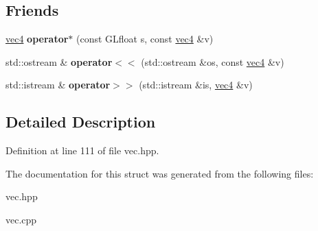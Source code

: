 \subsection*{Friends}
\begin{DoxyCompactItemize}
\item 
\hypertarget{struct_angel_1_1vec4_a18b1a91dc4c502220d099d6d85e504bc}{\hyperlink{struct_angel_1_1vec4}{vec4} {\bfseries operator$\ast$} (const G\-Lfloat s, const \hyperlink{struct_angel_1_1vec4}{vec4} \&v)}\label{struct_angel_1_1vec4_a18b1a91dc4c502220d099d6d85e504bc}

\item 
\hypertarget{struct_angel_1_1vec4_afadcf8884205c469256e4be7d96bfa12}{std\-::ostream \& {\bfseries operator$<$$<$} (std\-::ostream \&os, const \hyperlink{struct_angel_1_1vec4}{vec4} \&v)}\label{struct_angel_1_1vec4_afadcf8884205c469256e4be7d96bfa12}

\item 
\hypertarget{struct_angel_1_1vec4_ada396ae1c4ef513c6baf301f20f89bfa}{std\-::istream \& {\bfseries operator$>$$>$} (std\-::istream \&is, \hyperlink{struct_angel_1_1vec4}{vec4} \&v)}\label{struct_angel_1_1vec4_ada396ae1c4ef513c6baf301f20f89bfa}

\end{DoxyCompactItemize}


\subsection{Detailed Description}


Definition at line 111 of file vec.\-hpp.



The documentation for this struct was generated from the following files\-:\begin{DoxyCompactItemize}
\item 
vec.\-hpp\item 
vec.\-cpp\end{DoxyCompactItemize}
